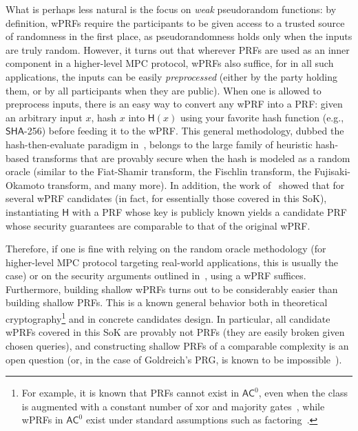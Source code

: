 \documentclass[journal=tosc,submission]{iacrtrans}
\theoremstyle{theorem}
\renewcommand\AC{\ensuremath{\mathsf{AC}}\xspace}
\newcommand\Hash{\ensuremath{\mathsf{H}}\xspace}
\begin{document}
What is perhaps less natural is the focus on \emph{weak} pseudorandom functions: by definition, wPRFs require the participants to be given access to a trusted source of randomness in the first place, as pseudorandomness holds only when the inputs are truly random. However, it turns out that wherever PRFs are used as an inner component in a higher-level MPC protocol, wPRFs also suffice, for in all such applications, the inputs can be easily \emph{preprocessed} (either by the party holding them, or by all participants when they are public). When one is allowed to preprocess inputs, there is an easy way to convert any wPRF into a PRF: given an arbitrary input $x$, hash $x$ into $\Hash(x)$ using your favorite hash function (e.g., $\mathsf{SHA}$-256) before feeding it to the wPRF. This general methodology, dubbed the hash-then-evaluate paradigm in~\cite{SCN:BCEKM24}, belongs to the large family of heuristic hash-based transforms that are provably secure when the hash is modeled as a random oracle (similar to the Fiat-Shamir transform, the Fischlin transform, the Fujisaki-Okamoto transform, and many more). In addition, the work of~\cite{SCN:BCEKM24} showed that for several wPRF candidates (in fact, for essentially those covered in this SoK), instantiating $\Hash$ with a PRF whose key is publicly known yields a candidate PRF whose security guarantees are comparable to that of the original wPRF.

Therefore, if one is fine with relying on the random oracle methodology (for higher-level MPC protocol targeting real-world applications, this is usually the case) or on the security arguments outlined in~\cite{SCN:BCEKM24}, using a wPRF suffices. Furthermore, building shallow wPRFs turns out to be considerably easier than building shallow PRFs. This is a known general behavior both in theoretical cryptography\footnote{For example, it is known that PRFs cannot exist in $\AC^0$, even when the class is augmented with a constant number of xor and majority gates~\cite{SODA:Viola13}, while wPRFs in $\AC^0$ exist under standard assumptions such as factoring~\cite{STOC:Kharitonov93}.} and in concrete candidates design. In particular, all candidate wPRFs covered in this SoK are provably not PRFs (they are easily broken given chosen queries), and constructing shallow PRFs of a comparable complexity is an open question (or, in the case of Goldreich's PRG, is known to be impossible~\cite{SODA:Viola13,TCC:AppRay16b}).
\end{document}
